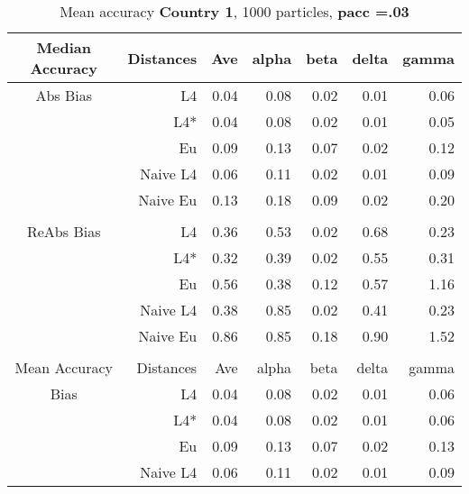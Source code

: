 \documentclass[a4paper,12pt,twoside]{book}
\begin{document}
\begin{table}[H]

\centering
\vfill
\vspace{2cm}
\caption{Mean  accuracy \textbf{Country 1}, 1000 particles, \textbf{pacc =.03}}


\begin{tabular}{crrrrrr}

  \hline
  
{\color{blue}Median Accuracy} & Distances & Ave & alpha & beta & delta & gamma \\ 
  \hline
{\color{blue}Abs Bias} & L4  &0.04 & 0.08 & 0.02 & 0.01 & 0.06 \\ 
  
&L4*  &0.04 & 0.08 & 0.02 & 0.01 & 0.05 \\ 
 
&Eu &   0.09 & 0.13 & 0.07 & 0.02 & 0.12 \\ 
   
&Naive L4&     0.06 & 0.11 & 0.02 & 0.01 & 0.09 \\
  
&Naive Eu &  0.13 & 0.18 & 0.09 & 0.02 & 0.20 \\ \\
 
   \hline
   
{\color{blue} ReAbs Bias } & L4  &0.36 & 0.53 & 0.02 & 0.68 & 0.23 \\ 
  
&L4*  &0.32 & 0.39 & 0.02 & 0.55 & 0.31 \\ 
  
&Eu &   
  0.56 & 0.38 & 0.12 & 0.57 & 1.16 \\ 
  
  
&Naive L4&   
  0.38 & 0.85 & 0.02 & 0.41 & 0.23 \\ 
&Naive Eu &   0.86 & 0.85 & 0.18 & 0.90 & 1.52 \\\\
   \hline
{\color{blue}Mean Accuracy} & Distances & Ave & alpha & beta & delta & gamma \\ 
  \hline
{\color{blue}Bias} & L4  &0.04 & 0.08 & 0.02 & 0.01 & 0.06 \\ 
 
&L4*  & 0.04 & 0.08 & 0.02 & 0.01 & 0.06 \\ 
 
  
&Eu &   0.09 & 0.13 & 0.07 & 0.02 & 0.13 \\ 
   
&Naive L4&  
  0.06 & 0.11 & 0.02 & 0.01 & 0.09 \\
   

\end{tabular}
\end{table}
\end{document}
